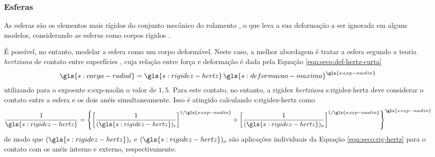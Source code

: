 \documentclass[12pt,oneside,english,brazil,lmodern,siglas,simbolos,cite=num]{ucsmonograph}
\begin{document}
	\subsubsection{Esferas}
	As esferas são os elementos mais rígidos do conjunto mecânico do rolamento \cite{sassi:2007}, o que leva a sua deformação a ser ignorada em alguns modelos, considerando as esferas como corpos rígidos \cite{mcfadden:1984,tandon:1997,sassi:2007,cong:2013}.
	
	É possível, no entanto, modelar a esfera como um corpo deformável.
	Neste caso, a melhor abordagem é tratar a esfera segundo a teoria \emph{hertziana} de contato entre superfícies \cite{patil:2010}, cuja relação entre força e deformação é dada pela Equação \ref{eqn:seco:def-hertz-curta}
	\begin{equation*}
		\gls{s:carga-radial} = \gls{s:rigidez-hertz}\,
		\gls{s:deformacao-maxima}^{\gls{s:exp-naolin}}
	\end{equation*}
	utilizando para o expoente \gls{s:exp-naolin} o valor de $1,5$.
	Para este contato, no entanto, a rigidez \emph{hertziana} \gls{s:rigidez-hertz} deve considerar o contato entre a esfera e os dois anéis simultaneamente.
	Isso é atingido calculando \gls{s:rigidez-hertz} como \cite{patil:2010,hamrock:1991}
	\begin{equation}
		\frac{1}{\gls{s:rigidez-hertz}} = \left\lbrace \left[
		\frac{1}{(\gls{s:rigidez-hertz})_i} \right]^{1/\gls{s:exp-naolin}}
		+ \left[
		\frac{1}{(\gls{s:rigidez-hertz})_o} \right]^{1/\gls{s:exp-naolin}}
		\right\rbrace^{\gls{s:exp-naolin}}
	\end{equation}
	de modo que $ (\gls{s:rigidez-hertz})_i $ e $ (\gls{s:rigidez-hertz})_o $ são aplicações individuais da Equação \ref{eqn:seco:rig-hertz} para o contato com os anéis interno e externo, respectivamente.
	
\end{document}
